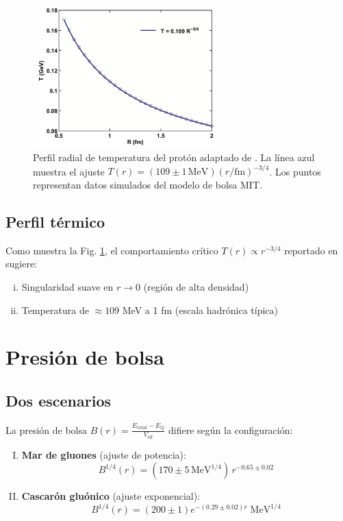 \begin{figure}[h]
    \centering
    \includegraphics[width=0.65\textwidth]{./Images/T(R).png}
    \caption{
    Perfil radial de temperatura del protón adaptado de \cite{tan2019}. 
    La línea azul muestra el ajuste $T(r) = (109 \pm 1\,\text{MeV})\left(r/\text{fm}\right)^{-3/4}$.
    Los puntos representan datos simulados del modelo de bolsa MIT.
    }
    \label{fig:Tprofile}
\end{figure}

\subsection{Perfil térmico}
Como muestra la Fig. \ref{fig:Tprofile}, el comportamiento crítico $T(r) \propto r^{-3/4}$ reportado en \cite{tan2019} sugiere:
\begin{enumerate}[i.]
    \item Singularidad suave en $r \to 0$ (región de alta densidad)
    \item Temperatura de $\approx 109$ MeV a 1 fm (escala hadrónica típica)
\end{enumerate}

\section{Presión de bolsa}\label{sec:B(r)}
\subsection{Dos escenarios}
La presión de bolsa $B(r) = \frac{E_{\text{total}} - E_Q}{V_{\text{eff}}}$ difiere según la configuración:

\begin{enumerate}[I.]
    \item \textbf{Mar de gluones} (ajuste de potencia):
    \begin{equation}\label{eq-Bsea}
        B^{1/4}(r) = (170 \pm 5\,\text{MeV}^{1/4})\,r^{-0.65 \pm 0.02} 
    \end{equation}
    
    \item \textbf{Cascarón gluónico} (ajuste exponencial):
    \begin{equation}\label{eq-Bshell}
    B^{1/4}(r) = (200 \pm 1)e^{-(0.29 \pm 0.02)r}\;\text{MeV}^{1/4}
    \end{equation}
\end{enumerate}

